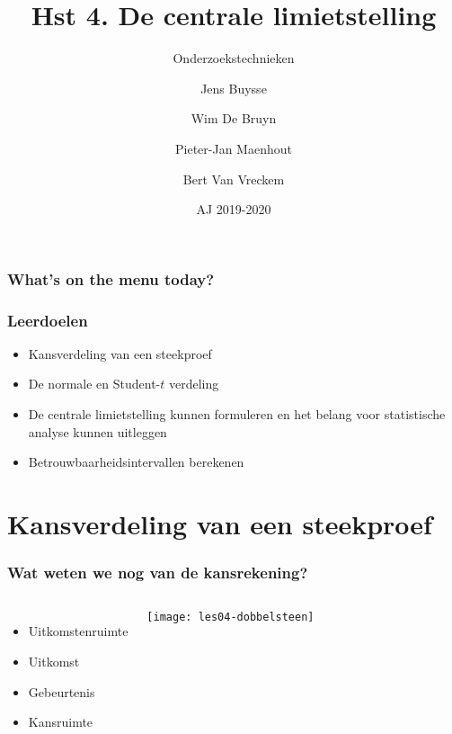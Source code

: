 \documentclass[aspectratio=169]{beamer}
\title{Hst 4. De centrale limietstelling}
\subtitle{Onderzoekstechnieken}
\author{Jens Buysse \and Wim {De Bruyn} \and Pieter-Jan Maenhout \and Bert {Van Vreckem}}
\date{AJ 2019-2020}
\begin{document}
\begin{frame}
  \maketitle
\end{frame}

\begin{frame}
  \frametitle{What's on the menu today?}
  
  \tableofcontents
\end{frame}

\begin{frame}
  \frametitle{Leerdoelen}
  
  \begin{itemize}
    \item Kansverdeling van een steekproef
    \item De normale en Student-$t$ verdeling
    \item De centrale limietstelling kunnen formuleren en het belang voor statistische analyse kunnen uitleggen
    \item Betrouwbaarheidsintervallen berekenen
  \end{itemize}
\end{frame}

\section{Kansverdeling van een steekproef}

\begin{frame}
  \frametitle{Wat weten we nog van de kansrekening?}
  
  \begin{columns}
    \begin{itemize}
      \item Uitkomstenruimte
      \item Uitkomst
      \item Gebeurtenis
      \item Kansruimte
    \end{itemize}
    
    \centering
    \texttt{[image: les04-dobbelsteen]}
  \end{columns}
  
\end{frame}
\end{document}
